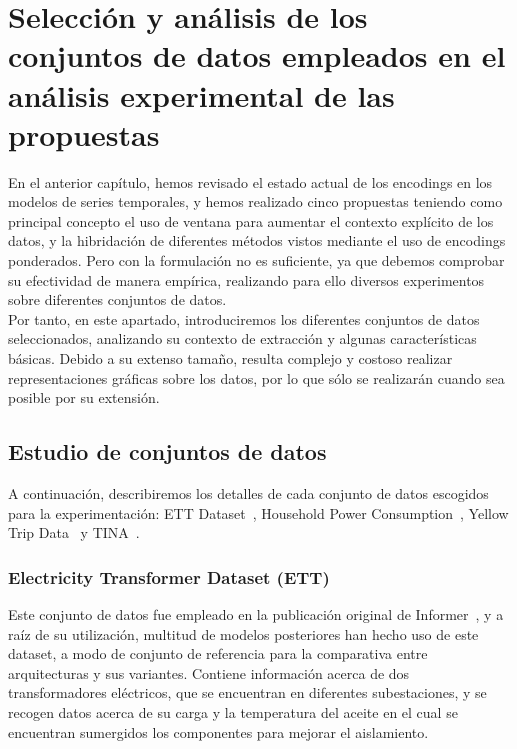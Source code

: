 \chapter{Selección y análisis de los conjuntos de datos empleados en el análisis experimental de las propuestas}

En el anterior capítulo, hemos revisado el estado actual de los encodings en los modelos de series temporales, y hemos realizado cinco propuestas teniendo como principal concepto el uso de ventana para aumentar el contexto explícito de los datos, y la hibridación de diferentes métodos vistos mediante el uso de encodings ponderados. Pero con la formulación no es suficiente, ya que debemos comprobar su efectividad de manera empírica, realizando para ello diversos experimentos sobre diferentes conjuntos de datos.\\

Por tanto, en este apartado, introduciremos los diferentes conjuntos de datos seleccionados, analizando su contexto de extracción y algunas características básicas. Debido a su extenso tamaño, resulta complejo y costoso realizar representaciones gráficas sobre los datos, por lo que sólo se realizarán cuando sea posible por su extensión.

\section{Estudio de conjuntos de datos}

A continuación, describiremos los detalles de cada conjunto de datos escogidos para la experimentación: ETT Dataset~\cite{zhou2021etdataset}, Household Power Consumption~\cite{hebrail2006individual}, Yellow Trip Data~\cite{nycopendata} y TINA~\cite{tina_dasci_arcelor}.

\subsection{Electricity Transformer Dataset (ETT)}

Este conjunto de datos fue empleado en la publicación original de Informer~\cite{zhou2021informerefficienttransformerlong}, y a raíz de su utilización, multitud de modelos posteriores han hecho uso de este dataset, a modo de conjunto de referencia para la comparativa entre arquitecturas y sus variantes. Contiene información acerca de dos transformadores eléctricos, que se encuentran en diferentes subestaciones, y se recogen datos acerca de su carga y la temperatura del aceite en el cual se encuentran sumergidos los componentes para mejorar el aislamiento.\\


